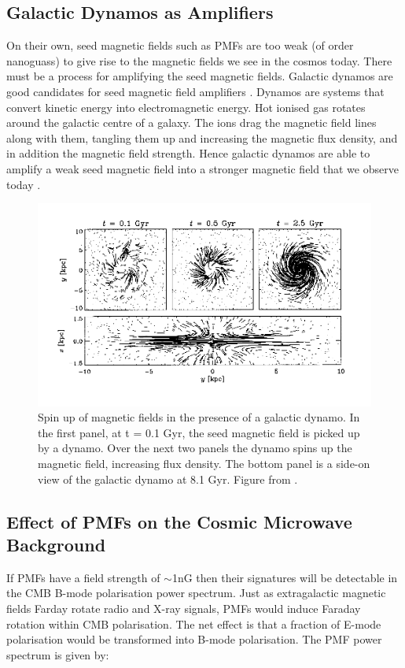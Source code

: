\subsection{Galactic Dynamos as Amplifiers}
On their own, seed magnetic fields such as PMFs are too weak (of order nanoguass) to give rise to the magnetic fields we see in the cosmos today. There must be a process for amplifying the seed magnetic fields. Galactic dynamos are good candidates for seed magnetic field amplifiers \cite{beck}. Dynamos are systems that convert kinetic energy into electromagnetic energy. Hot ionised gas rotates around the galactic centre of a galaxy. The ions drag the magnetic field lines along with them, tangling them up and increasing the magnetic flux density, and in addition the magnetic field strength. Hence galactic dynamos are able to amplify a weak seed magnetic field into a stronger magnetic field that we observe today \cite{Subramanian:2008tt}.

\begin{figure}[ht]
\centering
\includegraphics[scale=1]{images/dynamos_beck.png}
\caption{Spin up of magnetic fields in the presence of a galactic dynamo. In the first panel, at t = 0.1 Gyr, the seed magnetic field is picked up by a dynamo. Over the next two panels the dynamo spins up the magnetic field, increasing flux density. The bottom panel is a side-on view of the galactic dynamo at 8.1 Gyr. Figure from \cite{beck}.}
\end{figure}

\subsection{Effect of PMFs on the Cosmic Microwave Background}
If PMFs have a field strength of $\sim$1nG then their signatures will be detectable in the CMB B-mode polarisation power spectrum. Just as extragalactic magnetic fields Farday rotate radio and X-ray signals, PMFs would induce Faraday rotation within CMB polarisation. The net effect is that a fraction of E-mode polarisation would be transformed into B-mode polarisation. 
The PMF power spectrum is given by:

